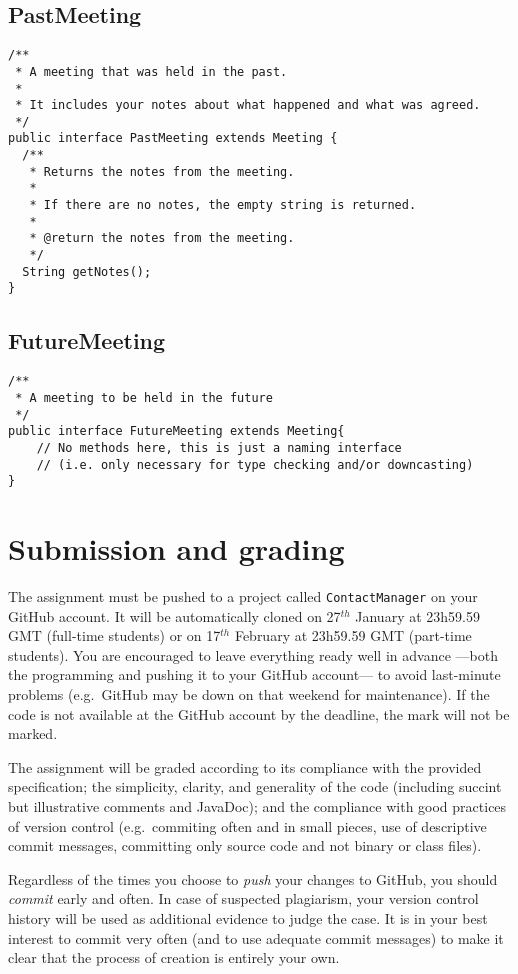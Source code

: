 \documentclass{article}
\begin{document}
\subsection{PastMeeting}
\label{sec:pastmeeting}

\begin{verbatim}
/**
 * A meeting that was held in the past. 
 *
 * It includes your notes about what happened and what was agreed.
 */
public interface PastMeeting extends Meeting {
  /**
   * Returns the notes from the meeting. 
   * 
   * If there are no notes, the empty string is returned. 
   * 
   * @return the notes from the meeting. 
   */
  String getNotes();
}
\end{verbatim}

\subsection{FutureMeeting}
\label{sec:futuremeeting}

\begin{verbatim}
/**
 * A meeting to be held in the future
 */
public interface FutureMeeting extends Meeting{
    // No methods here, this is just a naming interface
    // (i.e. only necessary for type checking and/or downcasting)
}
\end{verbatim}



\section{Submission and grading}
\label{sec:submission-grading}

The assignment must be pushed to a project called
\verb+ContactManager+ on your GitHub account. It will be automatically
cloned on 27$^{th}$ January at 23h59.59 GMT (full-time students)
or on 17$^{th}$ February at 23h59.59 GMT (part-time students). 
You are encouraged to
leave everything ready well in advance ---both the programming and
pushing it to your GitHub account--- to avoid last-minute problems 
(e.g.~GitHub may be down on that weekend for maintenance). If the
code is not available at the GitHub account by the deadline, the mark
will not be marked. 

The assignment will be graded according to its compliance with the
provided specification; the simplicity, clarity, and generality of
the code (including succint but illustrative comments and JavaDoc);
and the compliance with good practices of version control 
(e.g.~commiting often and in small pieces, use of descriptive commit
messages, committing only source code and not binary or class files). 

Regardless of the times you choose to \emph{push} your changes to
GitHub, you should \emph{commit} early and often. In case of suspected
plagiarism, your version control history will be used as additional
evidence to judge the case. It is in your best interest to commit very
often (and to use adequate commit messages) to make it clear that the
process of creation is entirely your own.
\end{document}
